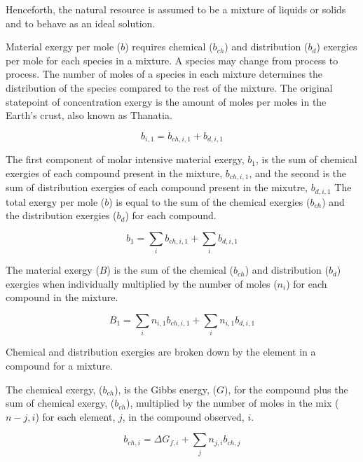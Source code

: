 \documentclass[energies,article,submit,pdftex,moreauthors]{Definitions/mdpi}
\begin{document}
Henceforth, the natural resource is assumed to be a mixture
of liquids or solids
and to behave as an ideal solution.

Material exergy per mole ($b$) requires chemical ($b_{ch}$)
and distribution ($b_d$) exergies per mole
for each species in a mixture.
A species may change from process to process.
The number of moles of a species in each mixture
determines the distribution of the species
compared to the rest of the mixture.
The original statepoint of concentration exergy is the amount of moles per moles
in the Earth's crust, also known as Thanatia.

\begin{equation}\label{eq:simplified_material_exergy_definition}
  b_{i,1} = b_{ch,i,1} + b_{d,i,1}
\end{equation}

The first component of molar intensive material exergy, $b_{1}$,
is the sum of chemical exergies of each compound
present in the mixture, $b_{ch,i,1}$,
and the second is the sum of distribution exergies of each compound
present in the mixutre, $b_{d,i,1}$
The total exergy per mole ($b$) is equal to the sum of the chemical exergies ($b_{ch}$)
and the distribution exergies ($b_d$) for each compound.

\begin{equation}\label{eq:specific_molar_intensive_exergy_definition}
  b_{1} = \sum_{i}{b_{ch,i,1}} + \sum_{i}{b_{d,i,1}}
\end{equation}

The material exergy ($B$) is the sum of the chemical ($b_{ch}$) and distribution ($b_d$) exergies
when individually multiplied
by the number of moles ($n_i$) for each compound
in the mixture.

\begin{equation}\label{eq:specific_exergy_definition}
  B_{1} = \sum_{i}{n_{i,1}b_{ch,i,1}} + \sum_{i}{n_{i,1}b_{d,i,1}}
\end{equation}

Chemical and distribution exergies are broken down
by the element in a compound
for a mixture.

The chemical exergy, ($b_{ch}$), is the Gibbs energy, ($G$), for the compound
plus the sum of chemical exergy, ($b_{ch}$),
multiplied by the number of moles
in the mix ($n-{j,i}$) for each element, $j$,
in the compound observed, $i$.

\begin{equation}\label{eq:specific_chemical_exergy_definition}
  b_{ch,i} = \Delta{G_{f,i}} + \sum_{j}{n_{j,i}b_{ch,j}}
\end{equation}
\end{document}
